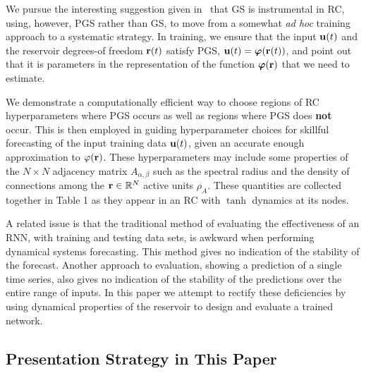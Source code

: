 \documentclass[12pt]{article}
\begin{document}

We pursue the interesting suggestion given in~\cite{hunt19,lymburn19} that GS is instrumental in RC, using, however, PGS rather than GS, to move from a somewhat {\it ad hoc} training approach to a systematic strategy.  In training, we ensure that the input $\mbox{$\bf{u}$}(t)$ and the reservoir degrees-of freedom $\mbox{{\bf r}}(t)$ satisfy PGS, $\mbox{$\bf{u}$}(t) = \mbox{$\boldsymbol{\varphi}$}(\mbox{{\bf r}}(t))$, and point out that it is parameters in the representation of the function $\mbox{$\boldsymbol{\varphi}$}(\mbox{{\bf r}})$ that we need to estimate.

We demonstrate a computationally efficient way to choose regions of RC hyperparameters where PGS occurs as well as regions where PGS does {\bf not} occur. This is then employed in guiding hyperparameter choices for skillful forecasting of the input training data $\mbox{$\bf{u}$}(t)$, given an accurate enough approximation to $\varphi(\mbox{{\bf r}})$. These hyperparameters may include some properties of the $N \times N$ adjacency matrix $A_{\alpha,\beta}$ such as the spectral radius and the density of connections among the $\mbox{{\bf r}} \in {\mathbb R}^N$ active units $\rho_{A}$. These quantities are collected together in Table 1 as they appear in an RC with $\tanh$ dynamics at its nodes.

A related issue is that the traditional method of evaluating the effectiveness of an RNN, with training and testing data sets, is awkward when performing dynamical systems forecasting. This method gives no indication of the stability of the forecast.  Another approach to evaluation, showing a prediction of a single time series, also gives no indication of the stability of the predictions over the entire range of inputs.  In this paper we attempt to rectify these deficiencies by using dynamical properties of the reservoir to design and evaluate a trained network.

\subsection{Presentation Strategy in This Paper}~\label{strategy}
\end{document}
